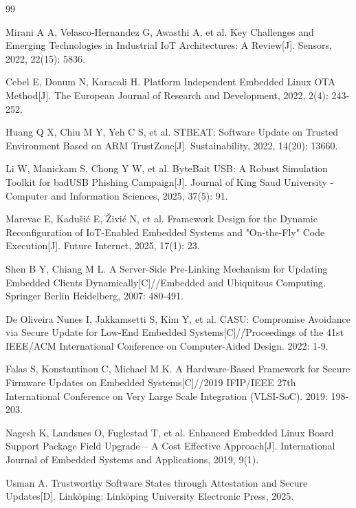 \documentclass[a4paper,12pt]{article}
\begin{document}
{\songti{}
\begin{thebibliography}{99}
\setlength{\itemsep}{0pt}
\setlength{\parskip}{0pt}

Mirani A A, Velasco-Hernandez G, Awasthi A, et al. Key Challenges and Emerging Technologies in Industrial IoT Architectures: A Review[J]. Sensors, 2022, 22(15): 5836.

Cebel E, Donum N, Karacali H. Platform Independent Embedded Linux OTA Method[J]. The European Journal of Research and Development, 2022, 2(4): 243-252.

Huang Q X, Chiu M Y, Yeh C S, et al. STBEAT: Software Update on Trusted Environment Based on ARM TrustZone[J]. Sustainability, 2022, 14(20): 13660.

Li W, Manickam S, Chong Y W, et al. ByteBait USB: A Robust Simulation Toolkit for badUSB Phishing Campaign[J]. Journal of King Saud University - Computer and Information Sciences, 2025, 37(5): 91.

Marevac E, Kadušić E, Živić N, et al. Framework Design for the Dynamic Reconfiguration of IoT-Enabled Embedded Systems and "On-the-Fly" Code Execution[J]. Future Internet, 2025, 17(1): 23.

Shen B Y, Chiang M L. A Server-Side Pre-Linking Mechanism for Updating Embedded Clients Dynamically[C]//Embedded and Ubiquitous Computing. Springer Berlin Heidelberg, 2007: 480-491.

De Oliveira Nunes I, Jakkamsetti S, Kim Y, et al. CASU: Compromise Avoidance via Secure Update for Low-End Embedded Systems[C]//Proceedings of the 41st IEEE/ACM International Conference on Computer-Aided Design. 2022: 1-9.

Falas S, Konstantinou C, Michael M K. A Hardware-Based Framework for Secure Firmware Updates on Embedded Systems[C]//2019 IFIP/IEEE 27th International Conference on Very Large Scale Integration (VLSI-SoC). 2019: 198-203.

Nagesh K, Landsnes O, Fuglestad T, et al. Enhanced Embedded Linux Board Support Package Field Upgrade – A Cost Effective Approach[J]. International Journal of Embedded Systems and Applications, 2019, 9(1).

Usman A. Trustworthy Software States through Attestation and Secure Updates[D]. Linköping: Linköping University Electronic Press, 2025.

\end{thebibliography}
}
\end{document}
